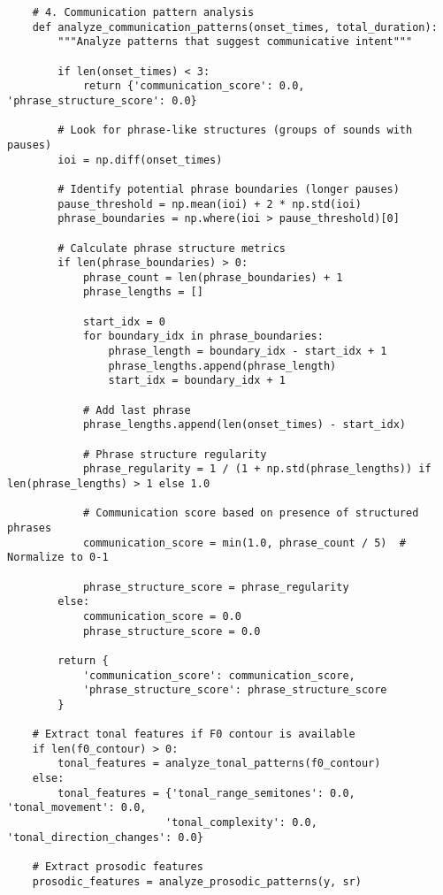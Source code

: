 \documentclass[12pt]{article}
\begin{document}
\begin{verbatim}
    # 4. Communication pattern analysis
    def analyze_communication_patterns(onset_times, total_duration):
        """Analyze patterns that suggest communicative intent"""
        
        if len(onset_times) < 3:
            return {'communication_score': 0.0, 'phrase_structure_score': 0.0}
        
        # Look for phrase-like structures (groups of sounds with pauses)
        ioi = np.diff(onset_times)
        
        # Identify potential phrase boundaries (longer pauses)
        pause_threshold = np.mean(ioi) + 2 * np.std(ioi)
        phrase_boundaries = np.where(ioi > pause_threshold)[0]
        
        # Calculate phrase structure metrics
        if len(phrase_boundaries) > 0:
            phrase_count = len(phrase_boundaries) + 1
            phrase_lengths = []
            
            start_idx = 0
            for boundary_idx in phrase_boundaries:
                phrase_length = boundary_idx - start_idx + 1
                phrase_lengths.append(phrase_length)
                start_idx = boundary_idx + 1
            
            # Add last phrase
            phrase_lengths.append(len(onset_times) - start_idx)
            
            # Phrase structure regularity
            phrase_regularity = 1 / (1 + np.std(phrase_lengths)) if len(phrase_lengths) > 1 else 1.0
            
            # Communication score based on presence of structured phrases
            communication_score = min(1.0, phrase_count / 5)  # Normalize to 0-1
            
            phrase_structure_score = phrase_regularity
        else:
            communication_score = 0.0
            phrase_structure_score = 0.0
        
        return {
            'communication_score': communication_score,
            'phrase_structure_score': phrase_structure_score
        }
    
    # Extract tonal features if F0 contour is available
    if len(f0_contour) > 0:
        tonal_features = analyze_tonal_patterns(f0_contour)
    else:
        tonal_features = {'tonal_range_semitones': 0.0, 'tonal_movement': 0.0, 
                         'tonal_complexity': 0.0, 'tonal_direction_changes': 0.0}
    
    # Extract prosodic features
    prosodic_features = analyze_prosodic_patterns(y, sr)
    

\end{verbatim}
\end{document}
